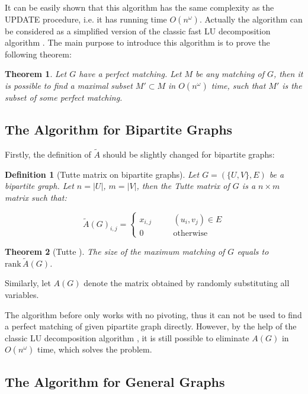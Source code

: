 \documentclass[a4paper]{article}
\newtheorem*{definition}{\hspace{2em}Definition}
\newtheorem{theorem}{\hspace{2em}Theorem}
\begin{document}
			It can be easily shown that this algorithm has the same complexity as the UPDATE procedure, i.e. it has running time $O(n^\omega)$. Actually the algorithm can be considered as a simplified version of the classic fast LU decomposition algorithm \cite{lu} . The main purpose to introduce this algorithm is to prove the following theorem:

			\begin{theorem}
				Let $G$ have a perfect matching. Let $M$ be any matching of $G$, then it is possible to find a maximal subset $M' \subset M$ in $O(n^\omega)$ time, such that $M'$ is the subset of some perfect matching.
				\label{submatch}
			\end{theorem}
		
		\subsection{The Algorithm for Bipartite Graphs}
			
			\hspace{2em}Firstly, the definition of $\tilde A$ should be slightly changed for bipartite graphs:

			\begin{definition}[Tutte matrix on bipartite graphs]
				Let  $G=(\{U, V\},E)$ be a bipartite graph. Let $n = |U|$, $m = |V|$, then the Tutte matrix of $G$ is a $n \times m$ matrix such that:

				$$ \tilde A(G)_{i,j} = \left\{ \begin{aligned} x_{i,j} & \quad & (u_i, v_j)\in E \\ 0 & \quad & \text{otherwise}\end{aligned} \right. $$
			\end{definition}

			\begin{theorem}[Tutte \cite{tuttetheorem}]
				The size of the maximum matching of $G$ equals to $\mathrm{rank}\, \tilde A(G)$.
			\end{theorem}
			
			Similarly, let $A(G)$ denote the matrix obtained by randomly substituting all variables.

			The algorithm before only works with no pivoting, thus it can not be used to find a perfect matching of given pipartite graph directly. However, by the help of the classic LU decomposition algorithm \cite{lu} , it is still possible to eliminate $A(G)$ in $O(n^\omega)$ time, which solves the problem.
		
		\subsection{The Algorithm for General Graphs}
\end{document}
